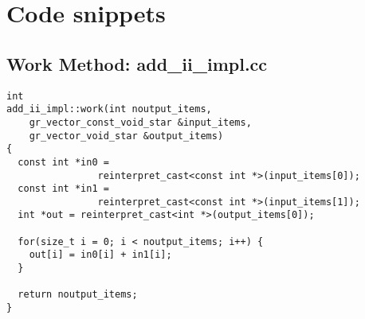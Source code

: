 
\section{Code snippets}
\label{sec:code-snip}

        \begin{minipage}{\linewidth}
        \subsection{Work Method: add\_ii\_impl.cc}
        \label{ssec:simple-worker}
                \begin{lstlisting}
int
add_ii_impl::work(int noutput_items,
    gr_vector_const_void_star &input_items,
    gr_vector_void_star &output_items)
{
  const int *in0 =
                reinterpret_cast<const int *>(input_items[0]);
  const int *in1 =
                reinterpret_cast<const int *>(input_items[1]);
  int *out = reinterpret_cast<int *>(output_items[0]);

  for(size_t i = 0; i < noutput_items; i++) {
    out[i] = in0[i] + in1[i];
  }

  return noutput_items;
}
                \end{lstlisting}
        \end{minipage}

